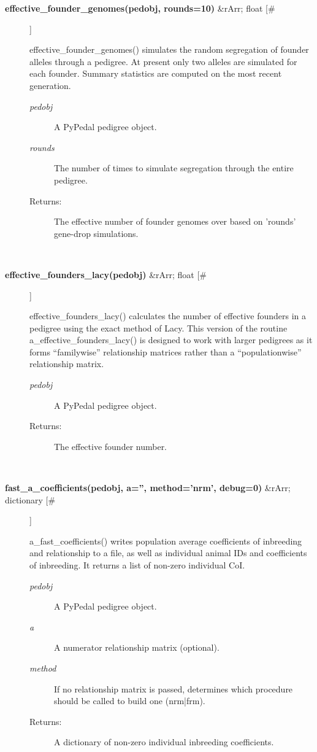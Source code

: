 \documentclass[10pt]{article}
\begin{document}
\begin{description}
\item[\textbf{effective\_founder\_genomes(pedobj, rounds=10)}
 \&rArr; float [\#]]

 effective\_founder\_genomes() simulates the random segregation of founder alleles through a pedigree. At present only two alleles are simulated for each founder. Summary statistics are computed on the most recent generation.
\begin{description}
\item[\emph{pedobj}
] A PyPedal pedigree object.
\item[\emph{rounds}
] The number of times to simulate segregation through the entire pedigree.
\item[Returns:] The effective number of founder genomes over based on 'rounds' gene-drop simulations.

\end{description}
\\ 

\item[\textbf{effective\_founders\_lacy(pedobj)}
 \&rArr; float [\#]]

 effective\_founders\_lacy() calculates the number of effective founders in a pedigree using the exact method of Lacy. This version of the routine a\_effective\_founders\_lacy() is designed to work with larger pedigrees as it forms ``familywise'' relationship matrices rather than a ``populationwise'' relationship matrix.
\begin{description}
\item[\emph{pedobj}
] A PyPedal pedigree object.
\item[Returns:] The effective founder number.

\end{description}
\\ 

\item[\textbf{fast\_a\_coefficients(pedobj, a='', method='nrm', debug=0)}
 \&rArr; dictionary [\#]]

 a\_fast\_coefficients() writes population average coefficients of inbreeding and relationship to a file, as well as individual animal IDs and coefficients of inbreeding. It returns a list of non-zero individual CoI.
\begin{description}
\item[\emph{pedobj}
] A PyPedal pedigree object.
\item[\emph{a}
] A numerator relationship matrix (optional).
\item[\emph{method}
] If no relationship matrix is passed, determines which procedure should be called to build one (nrm|frm).
\item[Returns:] A dictionary of non-zero individual inbreeding coefficients.


\end{description}
\end{description}
\end{document}
